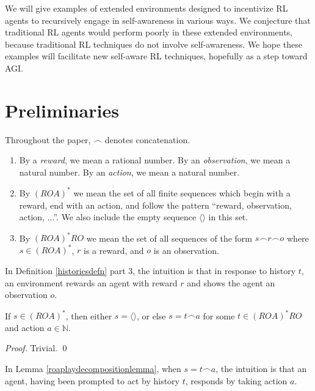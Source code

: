 \documentclass[runningheads]{llncs}
\begin{document}
We will give examples of
extended environments designed to incentivize RL agents to
recursively engage in self-awareness in various ways.
We conjecture that traditional RL agents would perform poorly in these extended
environments, because traditional RL techniques do not involve
self-awareness. We hope these examples will facilitate
new self-aware RL techniques, hopefully as a step toward AGI.

\section{Preliminaries}

Throughout the paper, $\frown$ denotes concatenation.

\begin{definition}
\label{historiesdefn}
    \begin{enumerate}
        \item
        By a \emph{reward}, we mean a rational number.
        By an \emph{observation}, we mean a natural number.
        By an \emph{action}, we mean a natural number.
        \item
        By $(ROA)^*$ we mean the set of all finite sequences which begin with
        a reward, end with an action, and follow the pattern
        ``reward, observation, action, ...''. We also include
        the empty sequence $\langle\rangle$ in this set.
        \item
        By $(ROA)^*RO$ we mean the set of all sequences of the form
        $s\frown r\frown o$ where $s\in (ROA)^*$, $r$ is a reward, and
        $o$ is an observation.
    \end{enumerate}
\end{definition}

In Definition \ref{historiesdefn} part 3, the intuition is that in response to
history $t$, an environment rewards an agent with reward $r$ and
shows the agent an observation $o$.

\begin{lemma}
\label{roaplaydecompositionlemma}
    If $s\in (ROA)^*$, then either $s=\langle\rangle$, or else
    $s=t\frown a$ for some $t\in (ROA)^*RO$ and action $a\in\mathbb N$.
\end{lemma}

\begin{proof}
    Trivial. \qed
\end{proof}

In Lemma \ref{roaplaydecompositionlemma}, when
$s=t\frown a$, the intuition is that an agent, having been prompted to act by
history $t$, responds by taking action $a$.
\end{document}
